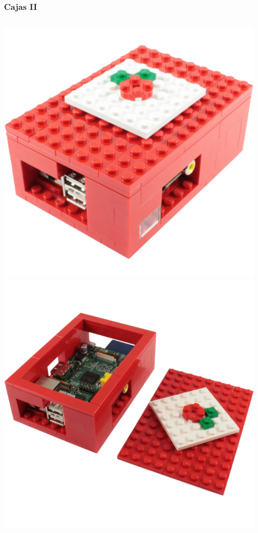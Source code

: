 \documentclass[10pt,colorlinks]{beamer}
\begin{document}
\begin{frame}[fragile]\frametitle{Cajas II}
\begin{columns}[c]
 \includegraphics[width=\textwidth]{figs/case1}
\includegraphics[width=\textwidth]{figs/case2}
\end{columns}
\end{frame}
\end{document}
